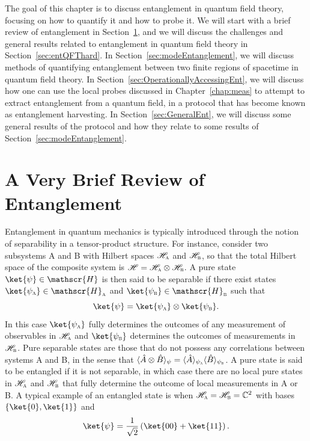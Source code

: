 \documentclass[letterpaper,12pt,titlepage,oneside,final]{book}
\newcommand{\tc}[1]{\textsc{#1}}
\begin{document}
The goal of this chapter is to discuss entanglement in quantum field theory, focusing on how to quantify it and how to probe it. We will start with a brief review of entanglement in Section~\ref{sec:EntRev}, and we will discuss the challenges and general results related to entanglement in quantum field theory in Section~\ref{sec:entQFThard}. In Section~\ref{sec:modeEntanglement}, we will discuss methods of quantifying entanglement between two finite regions of spacetime in quantum field theory. In Section~\ref{sec:OperationallyAccessingEnt}, we will discuss how one can use the local probes discussed in Chapter~\ref{chap:meas} to attempt to extract entanglement from a quantum field, in a protocol that has become known as entanglement harvesting. In Section~\ref{sec:GeneralEnt}, we will discuss some general results of the protocol and how they relate to some results of Section~\ref{sec:modeEntanglement}.


\section{A Very Brief Review of Entanglement}\label{sec:EntRev}


Entanglement in quantum mechanics is typically introduced through the notion of separability in a tensor-product structure. For instance, consider two subsystems A and B with Hilbert spaces $\mathscr{H}_\tc{a}$ and $\mathscr{H}_\tc{b}$, so that the total Hilbert space of the composite system is $\mathscr{H} = \mathscr{H}_\tc{a} \otimes \mathscr{H}_\tc{b}$. A pure state $\ket{\psi}\in \mathscr{H}$ is then said to be separable if there exist states $\ket{\psi_\tc{a}}\in\mathscr{H}_\tc{a}$ and $\ket{\psi_\tc{b}}\in\mathscr{H}_\tc{b}$ such that
\begin{equation}
    \ket{\psi} = \ket{\psi_\tc{a}}\otimes \ket{\psi_\tc{b}}.
\end{equation}
In this case $\ket{\psi_\tc{a}}$ fully determines the outcomes of any measurement of observables in $\mathscr{H}_\tc{a}$ and $\ket{\psi_\tc{b}}$ determines the outcomes of measurements in $\mathscr{H}_\tc{b}$. Pure separable states are those that do not possess any correlations between systems A and B, in the sense that $\langle \hat{A}\otimes\hat{B}\rangle_\psi = \langle \hat{A}\rangle_{\psi_\tc{a}}\langle\hat{B}\rangle_{\psi_\tc{b}}$. A pure state is said to be entangled if it is not separable, in which case there are no local pure states in $\mathscr{H}_\tc{a}$ and $\mathscr{H}_\tc{b}$ that fully determine the outcome of local measurements in A or B. A typical example of an entangled state is when $\mathscr{H}_\tc{a} = \mathscr{H}_\tc{b} = \mathbb{C}^2$ with bases $\{\ket{0},\ket{1}\}$ and
\begin{equation}\label{eq:EPR}
    \ket{\psi} = \frac{1}{\sqrt{2}}\left(\ket{00} + \ket{11}\right).
\end{equation}
\end{document}
